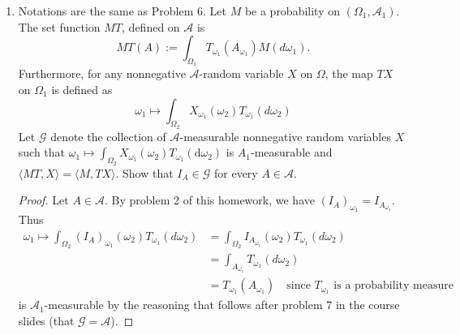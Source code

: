 \documentclass[letterpaper, 12pt]{article}
\newcommand{\cA}{\mathcal{A}}
\newcommand{\cG}{\mathcal{G}}
\newcommand{\sG}{\mathscr{G}}
\begin{document}
\begin{enumerate}
\begin{proof}
Therefore by \eqref{pt1} and \eqref{pt2} and Theorem 13.4 (ii) in Billingsley,
we have  
\[
\omega_1 \mapsto T_{\omega_1} \left(\left( \lim_{I \to \infty}\bigcup_{i = 1}^I B_i\right)_{\omega_1} \right)
\]
is measurable. Hence, $\lim_{I \to \infty}\cup_{i = 1}^I B_i \in \sG$.
We conclude $\sG$ is a $\lambda$-system.
\end{proof}

\item
Notations are the same as Problem 6. 
Let $M$ be a probability on $(\Omega_1, \cA_1)$. 
The set function $MT$, defined on $\cA$ is 
\[
MT(A) := \int_{\Omega_1} T_{\omega_1} (A_{\omega_1}) M (d \omega_1)
\text{.}
\]
Furthermore, for any nonnegative $\cA$-random variable $X$ on $\Omega$, the map $TX$ on $\Omega_1$ is defined as 
\[
\omega_1 \mapsto \int_{\Omega_2} X_{\omega_1} (\omega_2) T_{\omega_1} (d \omega_2)
\]
Let $\cG$ denote the collection of $\cA$-measurable nonnegative random variables $X$ such that $\omega_1\mapsto\int_{\Omega_2}X_{\omega_1}(\omega_2)T_{\omega_1}(\text{d}\omega_2)$ is $A_1$-measurable and $\langle MT,X\rangle= \langle M,TX \rangle$. 
Show that $I_A\in\cG$ for every $A\in\cA$.

\begin{proof}
Let $A \in \cA$.
By problem 2 of this homework, we have $(I_A)_{\omega_1} = I_{A_{\omega_1}}$. Thus
\begin{align}
\omega_1 \mapsto
\int_{\Omega_2} (I_A)_{\omega_1}(\omega_2) T_{\omega_1}(d\omega_2)
&= \int_{\Omega_2} I_{A_{\omega_1}}(\omega_2) T_{\omega_1}(d\omega_2) \label{eq4} \\
&= \int_{A_{\omega_1}} T_{\omega_1} (d \omega_2) \\
&= T_{\omega_1} (A_{\omega_1}) 
\quad
\text{since $T_{\omega_1}$ is a probability measure}\label{eq6}
\end{align}
is $\cA_1$-measurable by the reasoning that follows after problem 7 in the course slides (that $\sG = \cA$).


\end{proof}
\end{enumerate}
\end{document}
